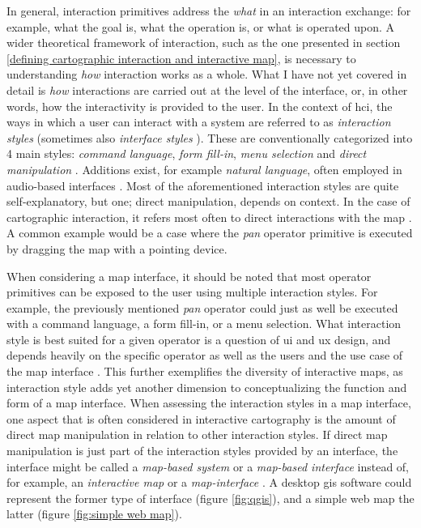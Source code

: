 

In general, interaction primitives
address the \textit{what} in an interaction exchange:
for example, what the goal is, what the operation is, or what is operated upon.
A wider theoretical framework of interaction, such as the one presented in
section \ref{defining cartographic interaction and interactive map},
is necessary to understanding \textit{how} interaction works as a whole.
What I have not yet covered in detail is
\textit{how} interactions are carried out at the level of the interface, or,
in other words, how the interactivity is provided to the user.
In the context of \acrshort{hci},
the ways in which a user can interact with a system are referred to as
\textit{interaction styles} \parencite{shn1995}
(sometimes also \textit{interface styles} \parencite{how1996}).
These are conventionally categorized into 4 main styles:
\textit{command language},
\textit{form fill-in},
\textit{menu selection} and
\textit{direct manipulation}
\parencite{soe2015}.
Additions exist, for example \textit{natural language},
often employed in audio-based interfaces \parencite{duc2018}.
Most of the aforementioned interaction styles are quite self-explanatory,
but one; direct manipulation, depends on context.
In the case of cartographic interaction,
it refers most often to direct interactions with the map \parencite{rot2012}.
A common example would be a case where the \textit{pan} operator primitive
is executed by dragging the map with a pointing device.

When considering a map interface,
it should be noted that most operator primitives
can be exposed to the user using multiple interaction styles.
For example, the previously mentioned \textit{pan} operator could just as well
be executed with a command language, a form fill-in, or a menu selection.
What interaction style is best suited for a given operator is a question
of \acrshort{ui} and \acrshort{ux} design,
and depends heavily on the specific operator as well as
the users and the use case of the map interface \parencite{rot2015}.
This further exemplifies the diversity of interactive maps,
as interaction style adds yet another dimension to conceptualizing the
function and form of a map interface.
When assessing the interaction styles in a map interface,
one aspect that is often considered in interactive cartography
is the amount of direct map manipulation in relation to other interaction styles.
If direct map manipulation is just part of
the interaction styles provided by an interface,
the interface might be called
a \textit{map-based system} or a \textit{map-based interface}
instead of, for example,
an \textit{interactive map} or a \textit{map-interface} \parencite{rot2013b}.
A desktop \acrshort{gis} software could represent the former type of interface (figure \ref{fig:qgis}),
and a simple web map the latter (figure \ref{fig:simple web map}).

